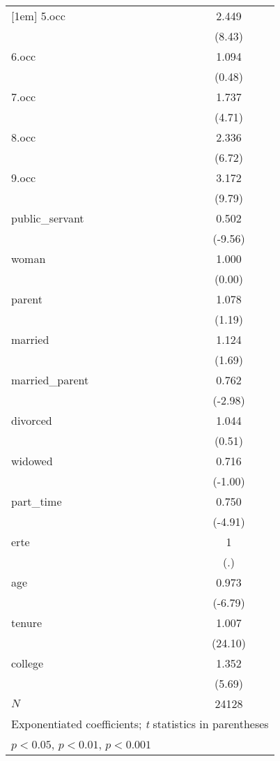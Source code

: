 {\begin{tabular}{l*{1}{c}}
[1em]
5.occ       &       2.449\sym{***}\\
            &      (8.43)         \\
[1em]
6.occ       &       1.094         \\
            &      (0.48)         \\
[1em]
7.occ       &       1.737\sym{***}\\
            &      (4.71)         \\
[1em]
8.occ       &       2.336\sym{***}\\
            &      (6.72)         \\
[1em]
9.occ       &       3.172\sym{***}\\
            &      (9.79)         \\
[1em]
public\_servant&       0.502\sym{***}\\
            &     (-9.56)         \\
[1em]
woman       &       1.000         \\
            &      (0.00)         \\
[1em]
parent      &       1.078         \\
            &      (1.19)         \\
[1em]
married     &       1.124         \\
            &      (1.69)         \\
[1em]
married\_parent&       0.762\sym{**} \\
            &     (-2.98)         \\
[1em]
divorced    &       1.044         \\
            &      (0.51)         \\
[1em]
widowed     &       0.716         \\
            &     (-1.00)         \\
[1em]
part\_time   &       0.750\sym{***}\\
            &     (-4.91)         \\
[1em]
erte        &           1         \\
            &         (.)         \\
[1em]
age         &       0.973\sym{***}\\
            &     (-6.79)         \\
[1em]
tenure      &       1.007\sym{***}\\
            &     (24.10)         \\
[1em]
college     &       1.352\sym{***}\\
            &      (5.69)         \\
\hline
\(N\)       &       24128         \\
\hline\hline
\multicolumn{2}{l}{\footnotesize Exponentiated coefficients; \textit{t} statistics in parentheses}\\
\multicolumn{2}{l}{\footnotesize \sym{*} \(p<0.05\), \sym{**} \(p<0.01\), \sym{***} \(p<0.001\)}\\
\end{tabular}
}
